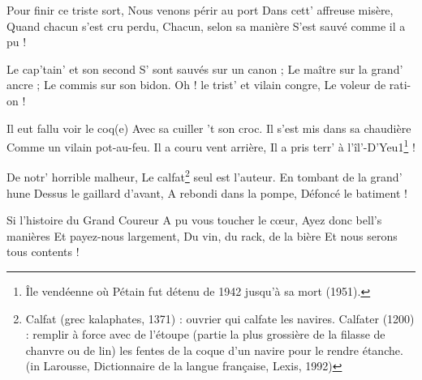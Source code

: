 \beginverse
Pour finir ce triste sort,
Nous venons périr au port
Dans cett' affreuse misère,
Quand chacun s'est cru perdu,
Chacun, selon sa manière
S'est sauvé comme il a pu !
\endverse

\beginverse
Le cap'tain' et son second
S' sont sauvés sur un canon ;
Le maître sur la grand' ancre ;
Le commis sur son bidon.
Oh ! le trist' et vilain congre,
Le voleur de rati-on !
\endverse

\beginverse
Il eut fallu voir le coq(e)
Avec sa cuiller 't son croc.
Il s'est mis dans sa chaudière
Comme un vilain pot-au-feu.
Il a couru vent arrière,
Il a pris terr' à l'îl'-D'Yeu1\footnote {Île vendéenne où Pétain fut détenu de 1942 jusqu'à sa mort (1951).} !
\endverse

\beginverse
De notr' horrible malheur,
Le calfat\footnote {Calfat (grec kalaphates, 1371) : ouvrier qui calfate les navires. Calfater (1200) : remplir à force avec de l'étoupe (partie la plus grossière de la filasse de chanvre ou de lin) les fentes de la coque d'un navire pour le rendre étanche. (in Larousse, Dictionnaire de la langue française, Lexis, 1992)} seul est l'auteur.
En tombant de la grand' hune
Dessus le gaillard d'avant,
A rebondi dans la pompe,
Défoncé le batiment !
\endverse

\beginverse
Si l'histoire du Grand Coureur
A pu vous toucher le cœur,
Ayez donc bell's manières
Et payez-nous largement,
Du vin, du rack, de la bière
Et nous serons tous contents !
\endverse

\endsong
